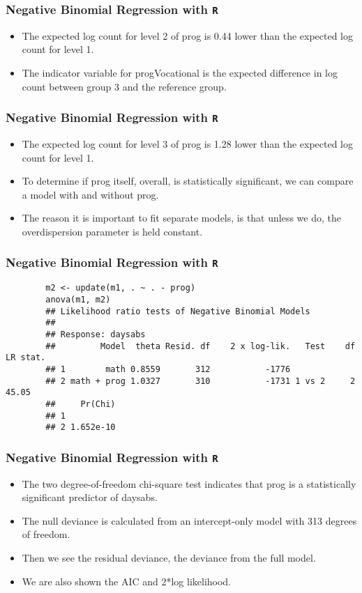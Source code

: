 \documentclass[MASTER.tex]{subfiles}
\begin{document}
\begin{frame}[fragile]
	\frametitle{Negative Binomial Regression with \texttt{R} }
	\Large
	\begin{itemize}
	\item 
	The expected log count for level 2 of prog is 0.44 lower than the expected log count for level 1. 
	\item The indicator variable for progVocational is the expected difference in log count between group 3 and
	the reference group.
	\end{itemize}
\end{frame}
\begin{frame}[fragile]
	\frametitle{Negative Binomial Regression with \texttt{R} }
	\Large
	\begin{itemize}	
	
	\item The expected log count for level 3 of prog is 1.28 lower than the expected log count for level 1. 
	\item To determine if prog itself, overall, is statistically significant, we can compare a model with and without prog. 
	\item The reason it is important to fit separate models, is that unless we do, the overdispersion parameter is held constant.
	\end{itemize}
\end{frame}
\begin{frame}[fragile]
	\frametitle{Negative Binomial Regression with \texttt{R} }

		\begin{verbatim}	
		m2 <- update(m1, . ~ . - prog)
		anova(m1, m2)
		## Likelihood ratio tests of Negative Binomial Models
		## 
		## Response: daysabs
		##         Model  theta Resid. df    2 x log-lik.   Test    df LR stat.
		## 1        math 0.8559       312           -1776                      
		## 2 math + prog 1.0327       310           -1731 1 vs 2     2    45.05
		##     Pr(Chi)
		## 1          
		## 2 1.652e-10
		\end{verbatim}
\end{frame}
\begin{frame}[fragile]
	\frametitle{Negative Binomial Regression with \texttt{R} }
	\Large
	
	\begin{itemize}
	\item The two degree-of-freedom chi-square test indicates that prog is a statistically significant predictor of daysabs.
	\item The null deviance is calculated from an intercept-only model with 313 degrees of freedom. 
	\item Then we see the residual deviance, the deviance from the full model. 
	\item We are also shown the AIC and 2*log likelihood.
\end{itemize}
\end{frame}
\end{document}
